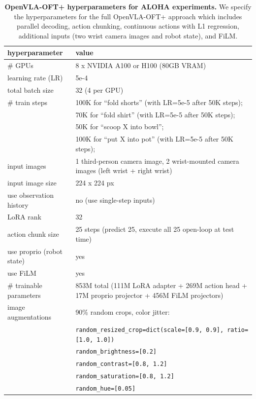 \documentclass[conference]{IEEEtran}
\begin{document}
\begin{table}
\centering
\caption{\textbf{OpenVLA-OFT+ hyperparameters for ALOHA experiments.} We specify the hyperparameters for the full OpenVLA-OFT+ approach which includes parallel decoding, action chunking, continuous actions with L1 regression, additional inputs (two wrist camera images and robot state), and FiLM.}
\label{tab:openvla_oft_hyperparameters_aloha}
\begin{tabular}{ll}
\toprule
hyperparameter & value \\
\midrule
\# GPUs & 8 x NVIDIA A100 or H100 (80GB VRAM) \\
learning rate (LR) & 5e-4 \\
total batch size & 32 (4 per GPU) \\
\# train steps & 100K for ``fold shorts'' (with LR=5e-5 after 50K steps); \\
& 70K for ``fold shirt'' (with LR=5e-5 after 50K steps); \\
& 50K for ``scoop X into bowl''; \\
& 100K for ``put X into pot'' (with LR=5e-5 after 50K steps); \\
input images & 1 third-person camera image, 2 wrist-mounted camera images (left wrist + right wrist) \\
input image size & 224 x 224 px \\
use observation history & no (use single-step inputs) \\
LoRA rank & 32 \\
action chunk size & 25 steps (predict 25, execute all 25 open-loop at test time) \\
use proprio (robot state) & yes \\
use FiLM & yes \\
\# trainable parameters & 853M total (111M LoRA adapter + 269M action head + 17M proprio projector + 456M FiLM projectors) \\
image augmentations & 90\% random crops, color jitter: \\
& \;\; \texttt{random\_resized\_crop=dict(scale=[0.9, 0.9], ratio=[1.0, 1.0])} \\
& \;\; \texttt{random\_brightness=[0.2]} \\
& \;\; \texttt{random\_contrast=[0.8, 1.2]} \\
& \;\; \texttt{random\_saturation=[0.8, 1.2]} \\
& \;\; \texttt{random\_hue=[0.05]} \\
\bottomrule
\end{tabular}
\end{table}
\end{document}
